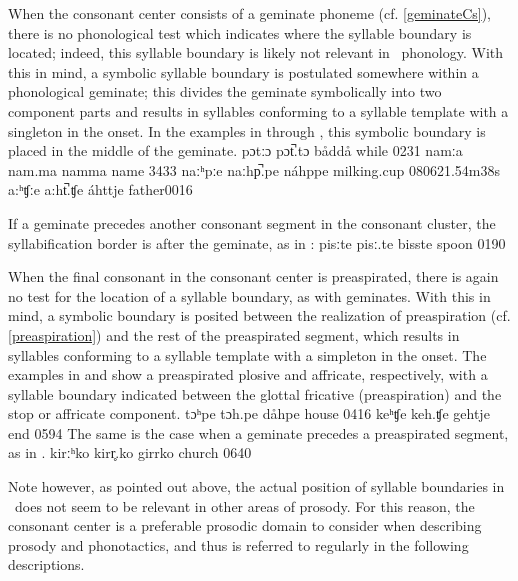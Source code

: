 When the consonant center consists of a geminate phoneme (cf. \SEC\ref{geminateCs}), there is no phonological test which indicates where the syllable boundary is located; 
indeed, this syllable boundary is likely not relevant in \PS\ phonology. With this in mind, a symbolic syllable boundary is postulated somewhere within a phonological geminate; this divides the geminate symbolically into two component parts and results in syllables conforming to a syllable template with a singleton in the onset. In the examples in  through , this symbolic boundary is placed in the middle of the geminate.
	{pɔtːɔ}	{pɔt̚.tɔ}		{båddå}	{while\BS{}}		{0231}
	{namːa}	{nam.ma}		{namma}	{name\BS{}}		{3433}
	{naːʰpːe}	{naːhp̚.pe}	{náhppe}	{milking.cup\BS{}}	{080621}{.54m38s}
		{a:ʰʧːe}	{a:ht̚.ʧe}	{áhttje}	{father\BS{}}{0016}

If a geminate precedes another consonant segment in the consonant cluster, the syllabification border is after the geminate, as in :
	{pisːte}	{pisː.te}		{bisste}	{spoon\BS{}}		{0190}

When the final consonant in the consonant center is preaspirated, there is again no test for the location of a syllable boundary, as with geminates. With this in mind, a symbolic boundary is posited between the realization of preaspiration (cf. \SEC\ref{preaspiration}) and the rest of the preaspirated segment, which results in syllables conforming to a syllable template with a simpleton in the onset. The examples in  and  show a preaspirated plosive and affricate, respectively, with a syllable boundary indicated between the glottal fricative (preaspiration) and the stop or affricate component.
	{tɔʰpe}	{tɔh.pe}		{dåhpe}	{house\BS{}}		{0416}
		{keʰʧe}	{keh.ʧe}		{gehtje}	{end\BS{}}		{0594}
The same is the case when a geminate precedes a preaspirated segment, as in . %
	{kirːʰko}	{kirr̥.ko}		{girrko}	{church\BS{}}		{0640}

Note however, as pointed out above, the actual position of syllable boundaries in \PS\ does not seem to be relevant in other areas of prosody. 
For this reason, the consonant center is a preferable prosodic domain to consider when describing prosody and phonotactics, and thus is referred to regularly in the following descriptions.



